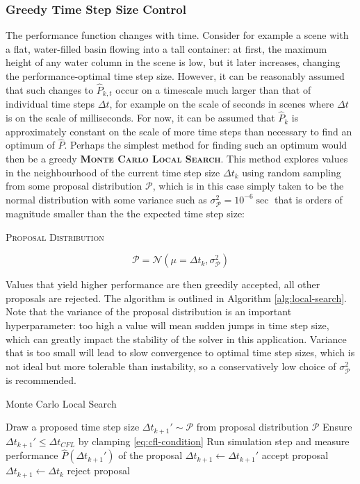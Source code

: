 \documentclass[oneside, a4paper]{book}
\newcommand\emphasis[1]{{\scshape\bfseries#1}}
\newcommand{\equationnamed}[2]{%
  \setlength{\fboxsep}{2pt} %
  \setlength{\fboxrule}{0.01pt}
  \begin{center}
    \begin{minipage}{\textwidth}
      \begin{center}\textsc{#1}\end{center}
      #2
    \end{minipage}
  \end{center}
}
\newcommand\br[1]{\left(#1\right)}
\begin{document}
    \subsubsection{Greedy Time Step Size Control}
    The performance function changes with time. Consider for example a scene with a flat, water-filled basin flowing into a tall container: at first, the maximum height of any water column in the scene is low, but it later increases, changing the performance-optimal time step size. However, it can be reasonably assumed that such changes to $\hat{P}_{k,t}$ occur on a timescale much larger than that of individual time steps $\Delta t$, for example on the scale of seconds in scenes where $\Delta t$ is on the scale of milliseconds. For now, it can be assumed that $\hat{P}_k$ is approximately constant on the scale of more time steps than necessary to find an optimum of $\hat{P}$. Perhaps the simplest method for finding such an optimum would then be a greedy \emphasis{Monte Carlo Local Search}. This method explores values in the neighbourhood of the current time step size $\Delta t_k$ using random sampling from some proposal distribution $\mathcal{P}$, which is in this case simply taken to be the normal distribution with some variance such as $\sigma^2_\mathcal{P}=10^{-6}\sec$ that is orders of magnitude smaller than the the expected time step size:
    \equationnamed{Proposal Distribution}{
    \begin{equation}
      \mathcal{P} = \mathcal{N}\br{\mu = \Delta t_k, \sigma^2_\mathcal{P}}
    \end{equation}
    }

    Values that yield higher performance are then greedily accepted, all other proposals are rejected. The algorithm is outlined in Algorithm \ref{alg:local-search}.
    Note that the variance of the proposal distribution is an important hyperparameter: too high a value will mean sudden jumps in time step size, which can greatly impact the stability of the solver in this application. Variance that is too small will lead to slow convergence to optimal time step sizes, which is not ideal but more tolerable than instability, so a conservatively low choice of $\sigma^2_\mathcal{P}$ is recommended.

    \begin{algorithm}
      \caption{Monte Carlo Local Search}
      \label{alg:local-search}
      \begin{algorithmic}[1]
          \State Draw a proposed time step size $\Delta t_{k+1}' \sim \mathcal{P}$ from proposal distribution $\mathcal{P}$ 
          \State Ensure $\Delta t_{k+1}' \leq \Delta t_{CFL}$ by clamping \Comment\autoref{eq:cfl-condition}
          \State Run simulation step and measure performance $\hat{P}\br{\Delta t_{k+1}'}$ of the proposal
          \If{$\hat{P}\br{\Delta t_{k+1}'} > \hat{P}\br{\Delta t_k}$} 
            \State $\Delta t_{k+1} \gets \Delta t_{k+1}'$ \Comment accept proposal
          \Else
            \State $\Delta t_{k+1} \gets \Delta t_{k}$ \Comment reject proposal
          \EndIf 
        \EndFor
      
      \end{algorithmic}
    \end{algorithm}
\end{document}
